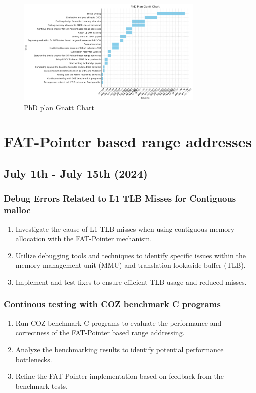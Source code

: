 \begin{figure}[h]
    \includegraphics[width=0.8\textwidth]{GnattChart.png}
    \caption{PhD plan Gnatt Chart}
    \label{fig:RMM}
  \end{figure}

\section{FAT-Pointer based range addresses}
\subsection{July 1th - July 15th (2024)}
    \subsubsection{Debug Errors Related to L1 TLB Misses for Contiguous malloc}
    \begin{enumerate}
        \item Investigate the cause of L1 TLB misses when using contiguous memory allocation with the FAT-Pointer mechanism.
        \item Utilize debugging tools and techniques to identify specific issues within the memory management unit (MMU) and translation lookaside buffer (TLB).
        \item Implement and test fixes to ensure efficient TLB usage and reduced misses.
    \end{enumerate}
    \subsubsection{Continous testing with COZ benchmark C programs}
    \begin{enumerate}
        \item Run COZ benchmark C programs to evaluate the performance and correctness of the FAT-Pointer based range addressing.
        \item Analyze the benchmarking results to identify potential performance bottlenecks.
        \item Refine the FAT-Pointer implementation based on feedback from the benchmark tests.
    \end{enumerate}
